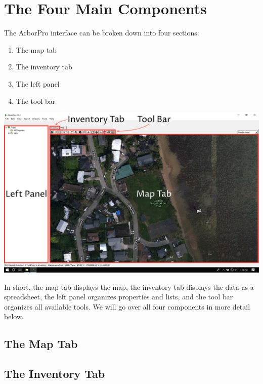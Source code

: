 \documentclass[]{book}
\providecommand{\tightlist}{%
  \setlength{\itemsep}{0pt}\setlength{\parskip}{0pt}}
\begin{document}
\hypertarget{the-four-main-components}{%
\section{The Four Main Components}\label{the-four-main-components}}

The ArborPro interface can be broken down into four sections:

\begin{enumerate}
\def\labelenumi{\arabic{enumi}.}
\tightlist
\item
  The map tab
\item
  The inventory tab
\item
  The left panel
\item
  The tool bar
\end{enumerate}

\includegraphics[width=40in]{images/interface-labelled}

In short, the map tab displays the map, the inventory tab displays the
data as a spreadsheet, the left panel organizes properties and lists,
and the tool bar organizes all available tools. We will go over all four
components in more detail below.

\hypertarget{the-map-tab}{%
\subsection{The Map Tab}\label{the-map-tab}}

\hypertarget{the-inventory-tab}{%
\subsection{The Inventory Tab}\label{the-inventory-tab}}
\end{document}

